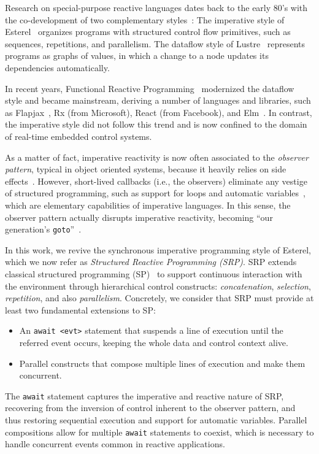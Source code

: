 \documentclass{acm_proc_article-sp}
\newcommand{\code}[1] {{\small{\texttt{#1}}}}
\newcommand{\1}{\;}
\newcommand{\2}{\;\;}
\newcommand{\3}{\;\;\;}
\newcommand{\5}{\;\;\;\;\;}
\begin{document}
Research on special-purpose reactive languages dates back to the early 80's 
with the co-development of two complementary 
styles~\cite{rp.twelve,rp.hypothesis}:
%
The imperative style of Esterel~\cite{esterel.ieee91} organizes programs with 
structured control flow primitives, such as sequences, repetitions, and 
parallelism.
%
The dataflow style of Lustre~\cite{lustre.ieee91} represents programs as graphs 
of values, in which a change to a node updates its dependencies automatically.

In recent years, Functional Reactive Programming~\cite{frp.principles} 
modernized the dataflow style and became mainstream, deriving a number of 
languages and libraries, such as Flapjax~\cite{frp.flapjax}, Rx (from 
Microsoft), React (from Facebook), and Elm~\cite{frp.elm}.
%
In contrast, the imperative style did not follow this trend and is now confined 
to the domain of real-time embedded control systems.

As a matter of fact, imperative reactivity is now often associated to the 
\emph{observer pattern}, typical in object oriented systems, because it heavily 
relies on side effects~\cite{rp.deprecating,rp.rescala}.
%
However, short-lived callbacks (i.e., the observers) eliminate any vestige of 
structured programming, such as support for loops and automatic 
variables~\cite{sync_async.cooperative}, which are elementary capabilities of 
imperative languages.
%
In this sense, the observer pattern actually disrupts imperative reactivity, 
becoming ``our generation's \code{goto}''~\cite{dij.goto,rp.goto,elm.goto}.

In this work, we revive the synchronous imperative programming style of 
Esterel, which we now refer as \emph{Structured Reactive Programming (SRP)}.
%
SRP extends classical structured programming (SP)~\cite{dij.notes} to support 
continuous interaction with the environment through hierarchical control 
constructs: \emph{concatenation}, \emph{selection}, \emph{repetition}, and also 
\emph{parallelism}.
%
Concretely, we consider that SRP must provide at least two fundamental 
extensions to SP:
%
\begin{itemize}
\item An \code{await <evt>} statement that suspends a line of execution until 
the referred event occurs, keeping the whole data and control context alive.
\item Parallel constructs that compose multiple lines of execution and make 
them concurrent.
\end{itemize}
%
The \code{await} statement captures the imperative and reactive nature of SRP, 
recovering from the inversion of control inherent to the observer pattern, and 
thus restoring sequential execution and support for automatic variables.
Parallel compositions allow for multiple \code{await} statements to coexist, 
which is necessary to handle concurrent events common in reactive applications.
\end{document}
